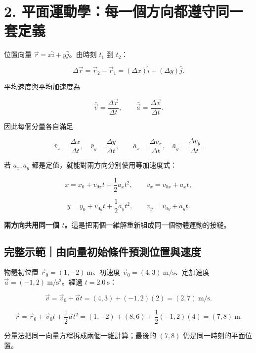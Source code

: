 \documentclass[11pt,a4paper]{article}
\begin{document}
\section{2. 平面運動學：每一個方向都遵守同一套定義}\label{ux5e73ux9762ux904bux52d5ux5b78ux6bcfux4e00ux500bux65b9ux5411ux90fdux9075ux5b88ux540cux4e00ux5957ux5b9aux7fa9}

位置向量 \(\vec r=x\hat i+y\hat j\)。由時刻 \(t_1\) 到 \(t_2\)：

\[
\Delta\vec r=\vec r_2-\vec r_1
=(\Delta x)\hat i+(\Delta y)\hat j.
\]

平均速度與平均加速度為

\[
\bar{\vec v}=\frac{\Delta\vec r}{\Delta t},
\qquad
\bar{\vec a}=\frac{\Delta\vec v}{\Delta t}.
\]

因此每個分量各自滿足

\[
\bar v_x=\frac{\Delta x}{\Delta t},
\quad
\bar v_y=\frac{\Delta y}{\Delta t},
\qquad
\bar a_x=\frac{\Delta v_x}{\Delta t},
\quad
\bar a_y=\frac{\Delta v_y}{\Delta t}.
\]

若 \(a_x,a_y\) 都是定值，就能對兩方向分別使用等加速度式：

\[
x=x_0+v_{0x}t+\frac12a_xt^2,
\qquad
v_x=v_{0x}+a_xt,
\]

\[
y=y_0+v_{0y}t+\frac12a_yt^2,
\qquad
v_y=v_{0y}+a_yt.
\]

\textbf{兩方向共用同一個 \(t\)。}這是把兩個一維解重新組成同一個物體運動的接縫。

\begin{HandoutWorkedExample}

\subsection{完整示範｜由向量初始條件預測位置與速度}\label{ux5b8cux6574ux793aux7bc4ux7531ux5411ux91cfux521dux59cbux689dux4ef6ux9810ux6e2cux4f4dux7f6eux8207ux901fux5ea6}

物體初位置 \(\vec r_0=(1,-2)\ \mathrm m\)、初速度 \(\vec v_0=(4,3)\ \mathrm{m/s}\)、定加速度 \(\vec a=(-1,2)\ \mathrm{m/s^2}\)。經過 \(t=2.0\ \mathrm s\)：

\[
\vec v=\vec v_0+\vec at=(4,3)+(-1,2)(2)=(2,7)\ \mathrm{m/s}.
\]

\[
\vec r=\vec r_0+\vec v_0t+\frac12\vec at^2
=(1,-2)+(8,6)+\frac12(-1,2)(4)
=(7,8)\ \mathrm m.
\]

分量法把同一向量方程拆成兩個一維計算；最後的 \((7,8)\) 仍是同一時刻的平面位置。

\end{HandoutWorkedExample}
\end{document}
